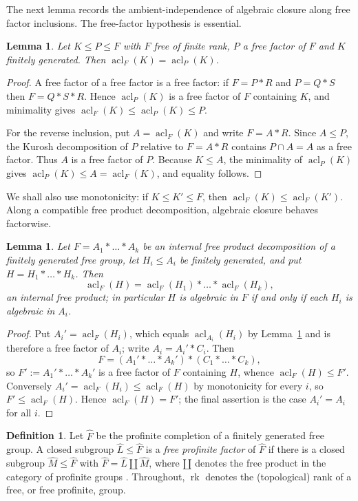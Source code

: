 \documentclass[11pt]{amsart}
\theoremstyle{plain}
\newtheorem{lemma}[theorem]{Lemma}
\theoremstyle{definition}
\newtheorem{definition}[theorem]{Definition}
\newcommand{\acl}{\operatorname{acl}}
\newcommand{\rk}{\operatorname{rk}}
\newcommand{\Fhat}{\widehat{F}}
\begin{document}
The next lemma records the ambient-independence of algebraic closure along free
factor inclusions. The free-factor hypothesis is essential.
\begin{lemma}\label{lem:acl-trans}
Let $K\le P\le F$ with $F$ free of finite rank, $P$ a free factor of $F$ and $K$
finitely generated. Then $\acl_F(K)=\acl_P(K)$.
\end{lemma}
\begin{proof}
A free factor of a free factor is a free factor: if $F=P*R$ and $P=Q*S$ then $F=Q*S*R$. Hence $\acl_P(K)$ is a free factor of $F$ containing $K$, and minimality gives $\acl_F(K)\le\acl_P(K)\le P$.

For the reverse inclusion, put $A=\acl_F(K)$ and write $F=A*R$. Since $A\le P$, the Kurosh decomposition of $P$ relative to $F=A*R$ contains $P\cap A=A$ as a free factor. Thus $A$ is a free factor of $P$. Because $K\le A$, the minimality of $\acl_P(K)$ gives $\acl_P(K)\le A=\acl_F(K)$, and equality follows.
\end{proof}
We shall also use monotonicity: if $K\le K'\le F$, then
$\acl_F(K)\le\acl_F(K')$. Along a compatible free product decomposition,
algebraic closure behaves factorwise.
\begin{lemma}\label{lem:acl-freeprod}
Let $F=A_1*\dots*A_k$ be an internal free product decomposition of a finitely
generated free group, let $H_i\le A_i$ be finitely generated, and put
$H=H_1*\dots*H_k$. Then
\[
  \acl_F(H)=\acl_F(H_1)*\dots*\acl_F(H_k),
\]
an internal free product; in particular $H$ is algebraic in $F$ if and only if
each $H_i$ is algebraic in $A_i$.
\end{lemma}
\begin{proof}
Put $A_i'=\acl_F(H_i)$, which equals $\acl_{A_i}(H_i)$ by
Lemma~\ref{lem:acl-trans} and is therefore a free factor of $A_i$; write
$A_i=A_i'*C_i$. Then
\[
  F=(A_1'*\dots*A_k')*(C_1*\dots*C_k),
\]
so $F':=A_1'*\dots*A_k'$ is a free factor of $F$ containing $H$, whence
$\acl_F(H)\le F'$. Conversely $A_i'=\acl_F(H_i)\le\acl_F(H)$ by monotonicity
for every $i$, so $F'\le\acl_F(H)$. Hence $\acl_F(H)=F'$; the final assertion
is the case $A_i'=A_i$ for all $i$.
\end{proof}
\begin{definition}\label{def:free-prof-factor}
Let $\Fhat$ be the profinite completion of a finitely generated free group. A
closed subgroup $\widehat L\le\Fhat$ is a \emph{free profinite factor} of
$\Fhat$ if there is a closed subgroup $\widehat M\le\Fhat$ with
$\Fhat=\widehat L\amalg\widehat M$, where $\amalg$ denotes the free product in
the category of profinite groups \cite[Ch.~9]{RZ}. Throughout, $\rk$ denotes the
(topological) rank of a free, or free profinite, group.
\end{definition}
\end{document}
